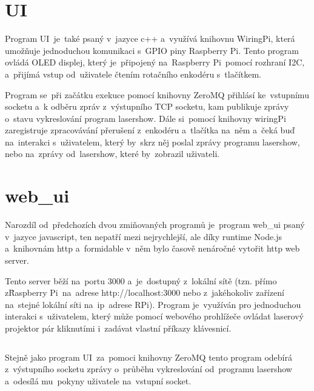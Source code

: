 \section{UI}
Program UI~je~také psaný v~jazyce c++ a~využívá knihovnu WiringPi, která umožňuje jednoduchou komunikaci s~GPIO piny Raspberry Pi. Tento program ovládá OLED displej, který je~připojený na~Raspberry Pi~pomocí rozhraní I2C, a~přijímá vstup od~uživatele čtením rotačního enkodéru s~tlačítkem.

Program se~při začátku exekuce pomocí knihovny ZeroMQ přihlásí ke~vstupnímu socketu a~k odběru zpráv z~výstupního TCP socketu, kam publikuje zprávy o~stavu vykreslování program lasershow. Dále si~pomocí knihovny wiringPi zaregistruje zpracovávání přerušení z~enkodéru a~tlačítka na~něm a~čeká buď na~interakci s~uživatelem, který by~skrz něj poslal zprávy programu lasershow, nebo na~zprávy od~lasershow, které by~zobrazil uživateli.


\section{web\_ui}

Narozdíl od~předchozích dvou zmiňovaných programů je~program web\_ui psaný v~jazyce javascript, ten nepatří mezi nejrychlejší, ale díky runtime Node.js a~knihovnám http a~formidable v~něm bylo časově nenáročné vytořit http web server.

Tento server běží na~portu 3000 a~je~dostupný z~lokální sítě (tzn. přímo z\~Raspberry Pi~na~adrese http://localhost:3000 nebo z~jakéhokoliv zařízení na~stejné lokální síti na~ip~adrese RPi).
Program je~využíván pro jednoduchou interakci s~uživatelem, který může pomocí webového prohlížeče ovládat laserový projektor pár kliknutími i~zadávat vlastní příkazy klávesnicí.


\inputminted{js}{code_examples/http_static_files.js}

Stejně jako program UI~za~pomoci knihovny ZeroMQ tento program odebírá z~výstupního socketu zprávy o~průběhu vykreslování od~programu lasershow a~odesílá mu~pokyny uživatele na~vstupní socket.



